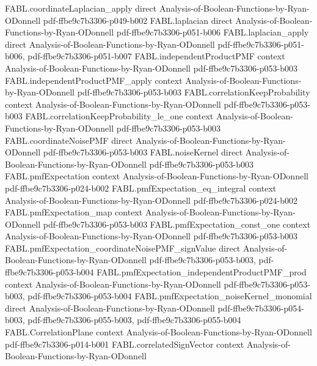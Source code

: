 \begin{theorem}
\proofstep
  {FABL.coordinateLaplacian_apply}
  {direct}
  {Analysis-of-Boolean-Functions-by-Ryan-ODonnell}
  {pdf-ffbe9c7b3306-p049-b002}
\proofstep
  {FABL.laplacian}
  {direct}
  {Analysis-of-Boolean-Functions-by-Ryan-ODonnell}
  {pdf-ffbe9c7b3306-p051-b006}
\proofstep
  {FABL.laplacian_apply}
  {direct}
  {Analysis-of-Boolean-Functions-by-Ryan-ODonnell}
  {pdf-ffbe9c7b3306-p051-b006,
    pdf-ffbe9c7b3306-p051-b007}
\proofstep
  {FABL.independentProductPMF}
  {context}
  {Analysis-of-Boolean-Functions-by-Ryan-ODonnell}
  {pdf-ffbe9c7b3306-p053-b003}
\proofstep
  {FABL.independentProductPMF_apply}
  {context}
  {Analysis-of-Boolean-Functions-by-Ryan-ODonnell}
  {pdf-ffbe9c7b3306-p053-b003}
\proofstep
  {FABL.correlationKeepProbability}
  {context}
  {Analysis-of-Boolean-Functions-by-Ryan-ODonnell}
  {pdf-ffbe9c7b3306-p053-b003}
\proofstep
  {FABL.correlationKeepProbability_le_one}
  {context}
  {Analysis-of-Boolean-Functions-by-Ryan-ODonnell}
  {pdf-ffbe9c7b3306-p053-b003}
\proofstep
  {FABL.coordinateNoisePMF}
  {direct}
  {Analysis-of-Boolean-Functions-by-Ryan-ODonnell}
  {pdf-ffbe9c7b3306-p053-b003}
\proofstep
  {FABL.noiseKernel}
  {direct}
  {Analysis-of-Boolean-Functions-by-Ryan-ODonnell}
  {pdf-ffbe9c7b3306-p053-b003}
\proofstep
  {FABL.pmfExpectation}
  {context}
  {Analysis-of-Boolean-Functions-by-Ryan-ODonnell}
  {pdf-ffbe9c7b3306-p024-b002}
\proofstep
  {FABL.pmfExpectation_eq_integral}
  {context}
  {Analysis-of-Boolean-Functions-by-Ryan-ODonnell}
  {pdf-ffbe9c7b3306-p024-b002}
\proofstep
  {FABL.pmfExpectation_map}
  {context}
  {Analysis-of-Boolean-Functions-by-Ryan-ODonnell}
  {pdf-ffbe9c7b3306-p053-b003}
\proofstep
  {FABL.pmfExpectation_const_one}
  {context}
  {Analysis-of-Boolean-Functions-by-Ryan-ODonnell}
  {pdf-ffbe9c7b3306-p053-b003}
\proofstep
  {FABL.pmfExpectation_coordinateNoisePMF_signValue}
  {direct}
  {Analysis-of-Boolean-Functions-by-Ryan-ODonnell}
  {pdf-ffbe9c7b3306-p053-b003,
    pdf-ffbe9c7b3306-p053-b004}
\proofstep
  {FABL.pmfExpectation_independentProductPMF_prod}
  {context}
  {Analysis-of-Boolean-Functions-by-Ryan-ODonnell}
  {pdf-ffbe9c7b3306-p053-b003,
    pdf-ffbe9c7b3306-p053-b004}
\proofstep
  {FABL.pmfExpectation_noiseKernel_monomial}
  {direct}
  {Analysis-of-Boolean-Functions-by-Ryan-ODonnell}
  {pdf-ffbe9c7b3306-p054-b003,
    pdf-ffbe9c7b3306-p055-b003,
    pdf-ffbe9c7b3306-p055-b004}
\proofstep
  {FABL.CorrelationPlane}
  {context}
  {Analysis-of-Boolean-Functions-by-Ryan-ODonnell}
  {pdf-ffbe9c7b3306-p014-b001}
\proofstep
  {FABL.correlatedSignVector}
  {context}
  {Analysis-of-Boolean-Functions-by-Ryan-ODonnell}

\end{theorem}

